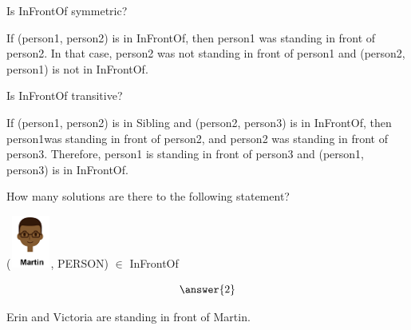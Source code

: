 \documentclass{ximera}
\begin{document}
\begin{exercise}
Is InFrontOf symmetric?

  \begin{multipleChoice}
  \end{multipleChoice}
  \begin{feedback}
  If (person1, person2) is in InFrontOf, then person1 was standing in front of person2.  In that case, person2 was not standing in front of person1 and (person2, person1) is not in InFrontOf.
  \end{feedback}
\end{exercise}





\begin{exercise}
Is InFrontOf transitive?

  \begin{multipleChoice}
  \end{multipleChoice}
  \begin{feedback}
If (person1, person2) is in Sibling and (person2, person3) is in InFrontOf, then person1was standing in front of person2, and person2 was standing in front of person3. Therefore, person1 is standing in front of person3 and (person1, person3) is in InFrontOf.
  \end{feedback}
\end{exercise}




\begin{exercise}
How many solutions are there to the following statement?  

({\includegraphics[width=50px,height=65px]{pics/people/martin.png}}, PERSON) $\in$ InFrontOf 

\[  \answer{2} \]

  \begin{feedback}
Erin and Victoria are standing in front of Martin.
  \end{feedback}
\end{exercise}
\end{document}
